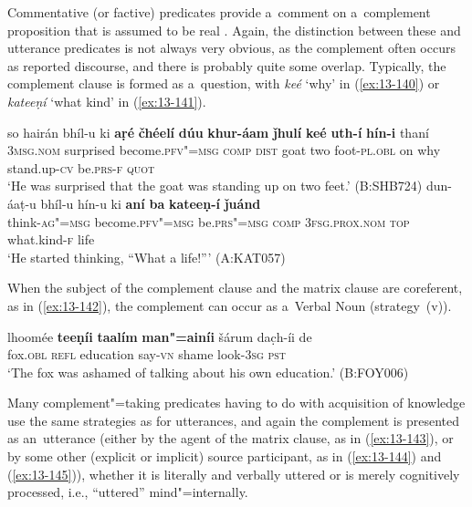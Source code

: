  Commentative (or factive) predicates provide a~comment on a~complement proposition that is assumed to be real \citep[127--129]{noonan2007}. Again, the distinction between these and utterance predicates is not always very obvious, as the complement often occurs as reported discourse, and there is probably quite some overlap. Typically, the complement clause is formed as a~question, with \textit{keé} `why' in (\ref{ex:13-140}) or \textit{kateeṇí} `what kind' in (\ref{ex:13-141}).

\ea
\label{ex:13-140}
\gll so hairán bhíl-u ki \textbf{aṛé} \textbf{čhéelí} \textbf{dúu} \textbf{khur-áam} \textbf{ǰhulí} \textbf{keé} \textbf{uth-í} \textbf{hín-i} thaní\\
\textsc{3msg.nom}  surprised become.\textsc{pfv"=msg} \textsc{comp} \textsc{dist} goat  two foot-\textsc{pl.obl} on why stand.up-\textsc{cv} be.\textsc{prs-f} \textsc{quot} \\
\glt `He was surprised that the goat was standing up on two feet.' (B:SHB724)
\ex
\label{ex:13-141}
\gll dun-áaṭ-u bhíl-u hín-u ki \textbf{aní} \textbf{ba} \textbf{kateeṇ-í} \textbf{ǰuánd}\\
think-\textsc{ag"=msg} become.\textsc{pfv"=msg} be.\textsc{prs"=msg} \textsc{comp} \textsc{3fsg.prox.nom} \textsc{top} what.kind-\textsc{f} life\\
\glt `He started thinking, ``What a life!''' (A:KAT057) 
\z

When the subject of the complement clause and the matrix clause are coreferent, as in (\ref{ex:13-142}), the complement can occur as a~Verbal Noun (strategy~(v)).

\begin{exe}
\ex
\label{ex:13-142}
\gll lhoomée \textbf{teeṇíi} \textbf{taalím} \textbf{man"=ainíi} šárum  dac̣h-íi de \\
fox.\textsc{obl} \textsc{ refl} education say-\textsc{vn} shame look-\textsc{3sg} \textsc{pst} \\
\glt `The fox was ashamed of talking about his own education.' (B:FOY006) 
\end{exe}

 Many complement"=taking predicates having to do with acquisition of knowledge use the same strategies as for utterances, and again the complement is presented as an~utterance (either by the agent of the matrix clause, as in (\ref{ex:13-143}), or by some other (explicit or implicit) source participant, as in (\ref{ex:13-144}) and (\ref{ex:13-145})), whether it is literally and verbally uttered or is merely cognitively processed, i.e., ``uttered'' mind"=internally. 

